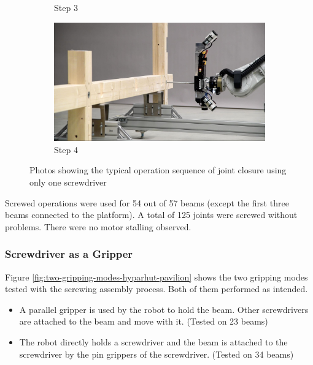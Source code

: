 \begin{figure}[!h]
\begin{subfigure}[b]{0.49\textwidth}
        \caption*{Step 3}
    \end{subfigure}
    \hfill
    \begin{subfigure}[b]{0.49\textwidth}
        \centering
        \includegraphics[width=\textwidth]{images/7b/img25.jpg}
        \caption*{Step 4}
    \end{subfigure}
    \caption{Photos showing the typical operation sequence of joint closure using only one screwdriver}
    \label{fig:seq-screwdriver-closure}
\end{figure}

Screwed operations were used for 54 out of 57 beams (except the first three beams connected to the platform). A total of 125 joints were screwed without problems. There were no motor stalling observed.

\subsubsection{Screwdriver as a Gripper}
\label{subsubsection:exploration-4-screwdriver-as-a-gripper}

Figure \ref{fig:two-gripping-modes-hyparhut-pavilion} shows the two gripping modes tested with the screwing assembly process. Both of them performed as intended. 
\begin{itemize}
    \item A parallel gripper is used by the robot to hold the beam. Other screwdrivers are attached to the beam and move with it. (Tested on 23 beams)
    \item The robot directly holds a screwdriver and the beam is attached to the screwdriver by the pin grippers of the screwdriver.  (Tested on 34 beams)
\end{itemize}

